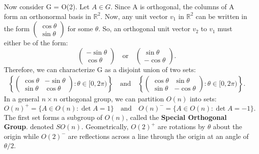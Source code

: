 \documentclass[a4 paper, 12pt]{article}
\begin{document}
\vspace{5mm}
	Now consider G = O(2). Let $A \in G.$ Since A is orthogonal, the columns of A form an orthonormal basis in $\mathbb{R}^2.$ Now, any unit vector $v_1$ in $\mathbb{R}^2$ can be written in the form 
	$\begin{pmatrix}
		\cos \theta \\ \sin \theta
	\end{pmatrix}$
	for some $\theta.$
	So, an orthogonal unit vector $v_2$ to $v_1$ must either be of the form:
	$$\begin{pmatrix}
		-\sin \theta \\ \cos \theta
	\end{pmatrix}
	\quad
	\text{or}
	\quad
	\begin{pmatrix}
		\sin \theta \\ -\cos \theta
	\end{pmatrix}.
	$$
	Therefore, we can characterize G as a disjoint union of two sets:
	\begin{align*}
	\left\{
	\begin{pmatrix}
		\cos \theta & -\sin \theta \\ 
		\sin \theta & \cos \theta
	\end{pmatrix}:
	\theta \in [0,2\pi)
	\right\}
	\quad
\text{and}
	\quad	
	\left\{
	\begin{pmatrix}
		\cos \theta & \sin \theta \\ 
		\sin \theta & -\cos \theta
	\end{pmatrix}:
	\theta \in [0,2\pi)
	\right\}.
	\end{align*}
	\cite{rotman}
	In a general $n \times n$ orthogonal group, we can partition $O(n)$ into sets:
	$$O(n)^+ = \{A \in O(n): \det A =1\} \quad \text{and} \quad O(n)^- = \{A \in O(n): \det A =-1\}.$$
	 The first set forms a subgroup of $O(n)$, called the \textbf{Special Orthogonal Group}. denoted $SO(n).$ \cite{baker}
	 Geometrically, $O(2)^+$ are rotations by $\theta$ about the origin while $O(2)^-$ are reflections across a line through the origin at an angle of $\theta/2.$

	
\end{document}
